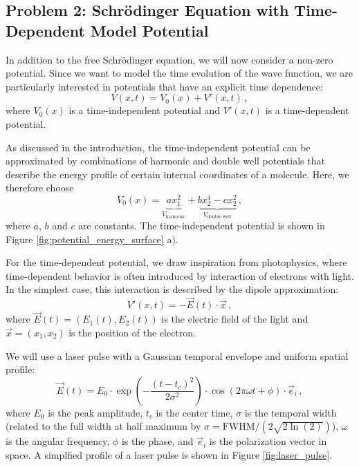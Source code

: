 \documentclass{article}
\theoremstyle{definition}
\theoremstyle{plain}
\theoremstyle{remark}
\begin{document}
\subsection*{Problem 2: Schrödinger Equation with Time-Dependent Model Potential}

In addition to the free Schrödinger equation, we will now consider a non-zero potential. Since we want to model the time evolution of the wave function, we are particularly interested in potentials that have an explicit time dependence:
\[
  V(x,t) = V_0 (x) + V'(x,t) \,,
\]
where $V_0 (x)$ is a time-independent potential and $V'(x,t)$ is a time-dependent potential.

As discussed in the introduction, the time-independent potential can be approximated by combinations of harmonic and double well potentials that describe the energy profile of certain internal coordinates of a molecule. Here, we therefore choose
\[
  V_0 (x) = \underbrace{a x_1^2}_{V_\text{harmonic}} + \underbrace{b x_2^4 - c x_2^2}_{V_\text{double well}} \,,
\]
where $a$, $b$ and $c$ are constants. The time-independent potential is shown in Figure \ref{fig:potential_energy_surface} a).

For the time-dependent potential, we draw inspiration from photophysics, where time-dependent behavior is often introduced by interaction of electrons with light. In the simplest case, this interaction is described by the dipole approximation:
\[
  V'(x,t) = - \vec{E}(t) \cdot \vec{x} \,,
\]
where $\vec{E}(t) = (E_1(t), E_2(t))$ is the electric field of the light and $\vec{x} = (x_1, x_2)$ is the position of the electron.

We will use a laser pulse with a Gaussian temporal envelope and uniform spatial profile:
\[
\vec{E}(t) = E_0 \cdot \exp\left(-\frac{(t - t_c)^2}{2\sigma^2}\right) \cdot \cos(2\pi\omega t + \phi) \cdot \vec{e}_i \,,
\]
where $E_0$ is the peak amplitude, $t_c$ is the center time, $\sigma$ is the temporal width (related to the full width at half maximum by $\sigma = \text{FWHM}/(2\sqrt{2\ln(2)})$), $\omega$ is the angular frequency, $\phi$ is the phase, and $\vec{e}_i$ is the polarization vector in space. A simplfied profile of a laser pulse is shown in Figure \ref{fig:laser_pulse}.
\end{document}
